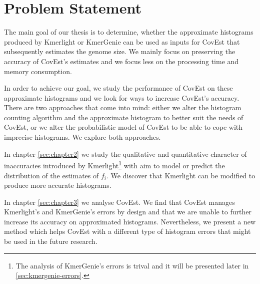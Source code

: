 \section{Problem Statement}
The main goal of our thesis is to determine, whether the approximate histograms
produced by Kmerlight or KmerGenie can be used as inputs for CovEst that 
subsequently estimates the genome size. We mainly focus on preserving the 
accuracy of CovEst's estimates and we focus less on the processing time and memory consumption. 

In order to achieve our goal, we study the performance of CovEst on these approximate
histograms and we look for ways to increase CovEst's accuracy. There are two approaches
that come into mind: either we alter the histogram counting algorithm and the approximate
histogram to better suit the needs of CovEst, or we alter the probabilistic model of CovEst to
be able to cope with imprecise histograms. We explore both approaches. 

In chapter \ref{sec:chapter2} we study the qualitative and quantitative character
of inaccuracies introduced by Kmerlight\footnote{The analysis of KmerGenie's errors is trival
and it will be presented later in \ref{sec:kmergenie-errors}.} with aim to model or
predict the distribution of the estimates of $f_i$. We discover that Kmerlight can be modified
to produce more accurate histograms.

In chapter \ref{sec:chapter3} we analyse CovEst. We find that CovEst manages Kmerlight's and
KmerGenie's errors by design and that we are unable to further increase its accuracy on
approximated histograms. Nevertheless, we present a new method which helps CovEst with
a different type of histogram errors that might be used in the future research.
